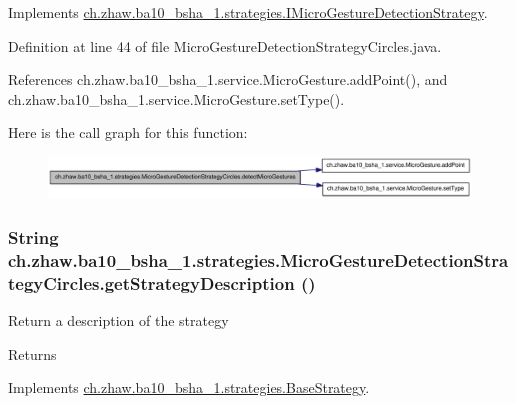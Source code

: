 Implements \hyperlink{interfacech_1_1zhaw_1_1ba10__bsha__1_1_1strategies_1_1IMicroGestureDetectionStrategy_a8593331fb67e5d4dc890d3db9f2d1b58}{ch.zhaw.ba10\_\-bsha\_\-1.strategies.IMicroGestureDetectionStrategy}.

Definition at line 44 of file MicroGestureDetectionStrategyCircles.java.

References ch.zhaw.ba10\_\-bsha\_\-1.service.MicroGesture.addPoint(), and ch.zhaw.ba10\_\-bsha\_\-1.service.MicroGesture.setType().

Here is the call graph for this function:\nopagebreak
\begin{figure}[H]
\begin{center}
\leavevmode
\includegraphics[width=376pt]{classch_1_1zhaw_1_1ba10__bsha__1_1_1strategies_1_1MicroGestureDetectionStrategyCircles_a1ce3987ae892eba2d0cf644a111933d3_cgraph}
\end{center}
\end{figure}
\hypertarget{classch_1_1zhaw_1_1ba10__bsha__1_1_1strategies_1_1MicroGestureDetectionStrategyCircles_af8c0c9ae9f2a172773c4a76833d2b687}{
\subsubsection[{getStrategyDescription}]{\setlength{\rightskip}{0pt plus 5cm}String ch.zhaw.ba10\_\-bsha\_\-1.strategies.MicroGestureDetectionStrategyCircles.getStrategyDescription ()}}
\label{classch_1_1zhaw_1_1ba10__bsha__1_1_1strategies_1_1MicroGestureDetectionStrategyCircles_af8c0c9ae9f2a172773c4a76833d2b687}
Return a description of the strategy

\begin{DoxyReturn}{Returns}

\end{DoxyReturn}


Implements \hyperlink{classch_1_1zhaw_1_1ba10__bsha__1_1_1strategies_1_1BaseStrategy_a75fdb36932ad701f6375cc1fe718056b}{ch.zhaw.ba10\_\-bsha\_\-1.strategies.BaseStrategy}.

